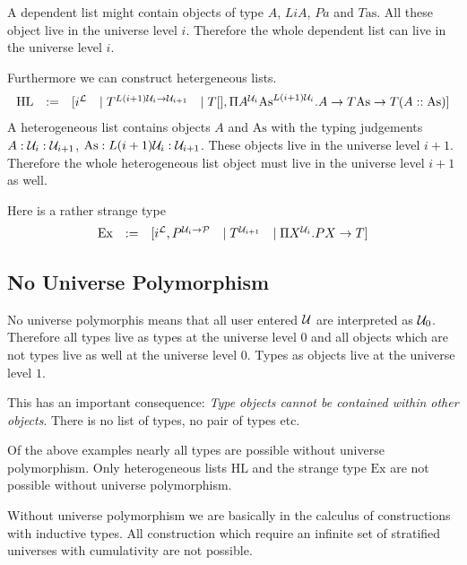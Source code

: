 A dependent list might contain objects of type $A$, $LiA$, $Pa$ and
$T\text{as}$. All these object live in the universe level $i$. Therefore the
whole dependent list can live in the universe level $i$.

Furthermore we can construct hetergeneous lists.
$$
\begin{array}{lllll}
    \text{HL} &:=&
    [
        i^{\cal L}
        &\mid
        T^{L(i+1){\cal U}_i \to {\cal U}_{i+1}}
        &\mid
        T[],
        \Pi A^{{\cal U}_i} \text{As}^{L(i+1){\cal U}_i}.
            A \to T\text{As} \to T(A :: \text{As})
    ]
\end{array}
$$
A heterogeneous list contains objects $A$ and $\text{As}$ with the typing
judgements $A : {\cal U}_i : {\cal U}_{i+1}$, $\text{As}: L(i+1){\cal U}_i : {\cal U}_{i+1}$.
These objects live in the universe level $i+1$. Therefore the whole
heterogeneous list object must live in the universe level $i+1$ as well.


Here is a rather strange type
$$
\begin{array}{lllll}
    \text{Ex}
    &:=&
    [
        i^{\cal L},
        P^{{\cal U}_i \to {\cal P}}
        &\mid
        T^{{\cal U}_{i+1}}
        &\mid
        \Pi X^{{\cal U}_i}. P X \to T
    ]
\end{array}
$$




\subsection{No Universe Polymorphism}

No universe polymorphis means that all user entered ${\cal U}$ are interpreted as
${\cal U}_0$. Therefore all types live as types at the universe level $0$ and all
objects which are not types live as well at the universe level $0$. Types as
objects live at the universe level $1$.

This has an important consequence: \emph{Type objects cannot be contained within
other objects}. There is no list of types, no pair of types etc.

Of the above examples nearly all types are possible without universe
polymorphism. Only heterogeneous lists $\text{HL}$ and the strange type
$\text{Ex}$ are not possible without universe polymorphism.

Without universe polymorphism we are basically in the calculus of constructions
with inductive types. All construction which require an infinite set of
stratified universes with cumulativity are not possible.
